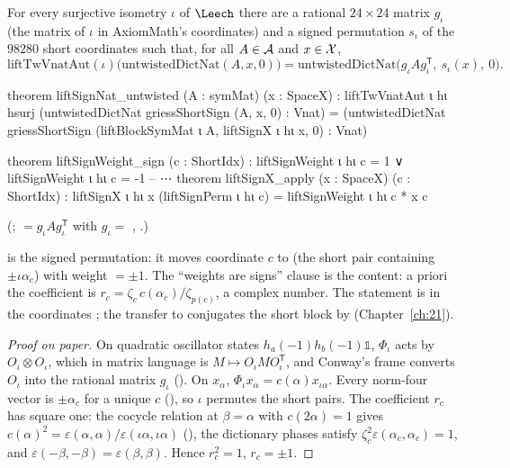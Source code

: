 \begin{theorem}\label{ch22:thm:untwistedblock}
For every surjective isometry $\iota$ of $\Leech$ there are a rational $24\times24$ matrix $g_\iota$ (the matrix of $\iota$ in
AxiomMath's coordinates) and a signed permutation $s_\iota$ of the $98280$ short coordinates such that, for all
$A\in\mathcal{A}$ and $x\in\mathcal{X}$,
\begin{equation*}
  \mathrm{liftTwVnatAut}(\iota)\bigl(\mathrm{untwistedDictNat}(A,x,0)\bigr)=\mathrm{untwistedDictNat}\bigl(g_\iota A
  g_\iota^{\mathsf T},\ s_\iota(x),\ 0\bigr).
\end{equation*}
\end{theorem}
\begin{leancode}
theorem liftSignNat_untwisted (A : symMat) (x : SpaceX) :
    liftTwVnatAut ι hι hsurj
        (untwistedDictNat griessShortSign (A, x, 0) : Vnat) =
      (untwistedDictNat griessShortSign
        (liftBlockSymMat ι A, liftSignX ι hι x, 0) : Vnat)
\end{leancode}
\begin{leancode}
theorem liftSignWeight_sign (c : ShortIdx) :
    liftSignWeight ι hι c = 1 ∨ liftSignWeight ι hι c = -1
-- ⋯
theorem liftSignX_apply (x : SpaceX) (c : ShortIdx) :
    liftSignX ι hι x (liftSignPerm ι hι c) = liftSignWeight ι hι c * x c
\end{leancode}
(;  $=g_\iota Ag_\iota^{\mathsf T}$ with
$g_\iota=$ , .)
\begin{dictionary}
 is the signed permutation: it moves coordinate $c$ to  (the short
pair containing $\pm\iota\alpha_c$) with weight  $=\pm1$.  The ``weights are signs'' clause is
the content: a priori the coefficient is $r_c=\zeta_c\,c(\alpha_c)/\zeta_{p(c)}$, a complex number.  The statement is
in the coordinates ; the transfer to  conjugates the short block by
 (Chapter~\ref{ch:21}).
\end{dictionary}
\begin{proof}[Proof on paper]
On quadratic oscillator states $h_a(-1)h_b(-1)\mathbb 1$, $\Phi_\iota$ acts by $O_\iota\otimes O_\iota$, which in
matrix language is $M\mapsto O_\iota MO_\iota^{\mathsf T}$, and Conway's frame converts $O_\iota$ into the rational matrix
$g_\iota$ ().  On $x_\alpha$, $\Phi_\iota x_\alpha=c(\alpha)x_{\iota\alpha}$.  Every norm-four
vector is $\pm\alpha_c$ for a unique $c$ (), so $\iota$ permutes the short pairs.  The
coefficient $r_c$ has square one: the cocycle relation at $\beta=\alpha$ with $c(2\alpha)=1$ gives
$c(\alpha)^2=\varepsilon(\alpha,\alpha)/\varepsilon(\iota\alpha,\iota\alpha)$ (), the dictionary phases
satisfy $\zeta_c^2\varepsilon(\alpha_c,\alpha_c)=1$, and $\varepsilon(-\beta,-\beta)=\varepsilon(\beta,\beta)$.  Hence
$r_c^2=1$, $r_c=\pm1$.
\end{proof}
